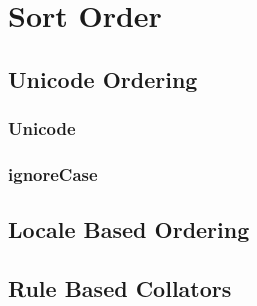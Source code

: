 
\chapter{Sort Order}%
\label{sec:sort.order}

\INCOMPLETE

\section{Unicode Ordering}

\INCOMPLETE

\subsection{Unicode}

\INCOMPLETE

\subsection{ignoreCase}

\INCOMPLETE

\section{Locale Based Ordering}

\INCOMPLETE

\section{Rule Based Collators}

\INCOMPLETE




\endinput
%

